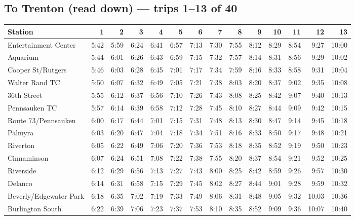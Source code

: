 \subsection*{To Trenton (read down) --- trips 1--13 of 40}
\begin{center}\footnotesize\setlength{\tabcolsep}{3pt}\begin{tabular}{@{}lrrrrrrrrrrrrr@{}}\toprule
Station & 1 & 2 & 3 & 4 & 5 & 6 & 7 & 8 & 9 & 10 & 11 & 12 & 13 \\\midrule
Entertainment Center & 5:42 & 5:59 & 6:24 & 6:41 & 6:57 & 7:13 & 7:30 & 7:55 & 8:12 & 8:29 & 8:54 & 9:27 & 10:00 \\
Aquarium & 5:44 & 6:01 & 6:26 & 6:43 & 6:59 & 7:15 & 7:32 & 7:57 & 8:14 & 8:31 & 8:56 & 9:29 & 10:02 \\
Cooper St/Rutgers & 5:46 & 6:03 & 6:28 & 6:45 & 7:01 & 7:17 & 7:34 & 7:59 & 8:16 & 8:33 & 8:58 & 9:31 & 10:04 \\
Walter Rand TC & 5:50 & 6:07 & 6:32 & 6:49 & 7:05 & 7:21 & 7:38 & 8:03 & 8:20 & 8:37 & 9:02 & 9:35 & 10:08 \\
36th Street & 5:55 & 6:12 & 6:37 & 6:56 & 7:10 & 7:26 & 7:43 & 8:08 & 8:25 & 8:42 & 9:07 & 9:40 & 10:13 \\
Pennsauken TC & 5:57 & 6:14 & 6:39 & 6:58 & 7:12 & 7:28 & 7:45 & 8:10 & 8:27 & 8:44 & 9:09 & 9:42 & 10:15 \\
Route 73/Pennsauken & 6:00 & 6:17 & 6:44 & 7:01 & 7:15 & 7:31 & 7:48 & 8:13 & 8:30 & 8:47 & 9:14 & 9:45 & 10:18 \\
Palmyra & 6:03 & 6:20 & 6:47 & 7:04 & 7:18 & 7:34 & 7:51 & 8:16 & 8:33 & 8:50 & 9:17 & 9:48 & 10:21 \\
Riverton & 6:05 & 6:22 & 6:49 & 7:06 & 7:20 & 7:36 & 7:53 & 8:18 & 8:35 & 8:52 & 9:19 & 9:50 & 10:23 \\
Cinnaminson & 6:07 & 6:24 & 6:51 & 7:08 & 7:22 & 7:38 & 7:55 & 8:20 & 8:37 & 8:54 & 9:21 & 9:52 & 10:25 \\
Riverside & 6:12 & 6:29 & 6:56 & 7:13 & 7:27 & 7:43 & 8:00 & 8:25 & 8:42 & 8:59 & 9:26 & 9:57 & 10:30 \\
Delanco & 6:14 & 6:31 & 6:58 & 7:15 & 7:29 & 7:45 & 8:02 & 8:27 & 8:44 & 9:01 & 9:28 & 9:59 & 10:32 \\
Beverly/Edgewater Park & 6:18 & 6:35 & 7:02 & 7:19 & 7:33 & 7:49 & 8:06 & 8:31 & 8:48 & 9:05 & 9:32 & 10:03 & 10:36 \\
Burlington South & 6:22 & 6:39 & 7:06 & 7:23 & 7:37 & 7:53 & 8:10 & 8:35 & 8:52 & 9:09 & 9:36 & 10:07 & 10:40 \\

\end{tabular}
\end{center}

